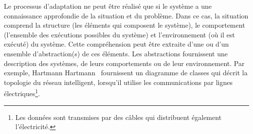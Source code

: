 %
Le processus d'adaptation ne peut être réalisé que si le système a une connaissance approfondie de la situation et du problème. 
Dans ce cas, la situation comprend la structure (les éléments qui composent le système), le comportement (l'ensemble des exécutions possibles du système) et l'environnement (où il est exécuté) du système.
Cette compréhension peut être extraite d'une ou d'un ensemble d'abstraction(s) de ces éléments.
Les abstractions fournissent une description des systèmes, de leurs comportements ou de leur environnement. 
Par exemple, Hartmann Hartmann~\etal \cite{DBLP:conf/smartgridcomm/0001FKTPTR14} fournissent un diagramme de classes qui décrit la topologie du réseau intelligent, lorsqu'il utilise les communications par lignes électriques\footnote{Les données sont transmises par des câbles qui distribuent également l'électricité.}.

